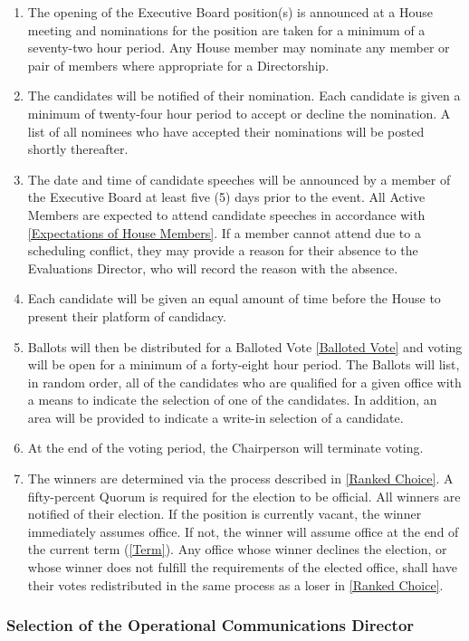 \documentclass{article}
\newcommand{\asubsection}[1]{\subsubsection{#1} \label{#1}}
\begin{document}
\begin{enumerate}
	\item The opening of the Executive Board position(s) is announced at a House meeting and nominations for the position are taken for a minimum of a seventy-two hour period.
		Any House member may nominate any member or pair of members where appropriate for a Directorship.
	\item The candidates will be notified of their nomination.
		Each candidate is given a minimum of twenty-four hour period to accept or decline the nomination.
		A list of all nominees who have accepted their nominations will be posted shortly thereafter.
	\item The date and time of candidate speeches will be announced by a member of the Executive Board at least five (5) days prior to the event. 
		All Active Members are expected to attend candidate speeches in accordance with \ref{Expectations of House Members}.
		If a member cannot attend due to a scheduling conflict, they may provide a reason for their absence to the Evaluations Director, who will record the reason with the absence.
	\item Each candidate will be given an equal amount of time before the House to present their platform of candidacy.
	\item Ballots will then be distributed for a Balloted Vote \ref{Balloted Vote} and voting will be open for a minimum of a forty-eight hour period.
		The Ballots will list, in random order, all of the candidates who are qualified for a given office with a means to indicate the selection of one of the candidates.
		In addition, an area will be provided to indicate a write-in selection of a candidate.
	\item At the end of the voting period, the Chairperson will terminate voting.
	\item The winners are determined via the process described in \ref{Ranked Choice}.
		A fifty-percent Quorum is required for the election to be official.
		All winners are notified of their election.
		If the position is currently vacant, the winner immediately assumes office.
		If not, the winner will assume office at the end of the current term (\ref{Term}).
		Any office whose winner declines the election, or whose winner does not fulfill the requirements of the elected office, shall have their votes redistributed in the same process as a loser in \ref{Ranked Choice}.
\end{enumerate}
\asubsection{Selection of the Operational Communications Director}
\end{document}
